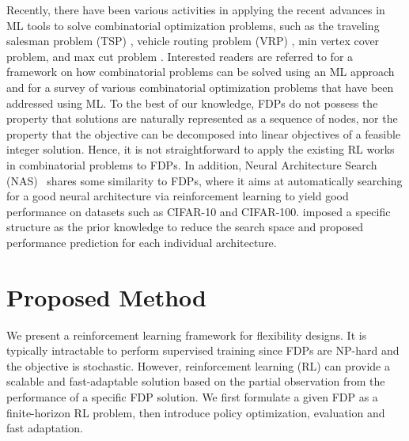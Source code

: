 \documentclass{article} %
\newcommand{\lei}[1]{{\color{red}{\bf\sf [Lei: #1]}}}
\begin{document}
Recently, there have been various activities in applying the recent advances in ML tools to solve combinatorial optimization problems, such as the traveling salesman problem (TSP) \citep{bello2016neural,vinyals2015pointer}, vehicle routing problem (VRP) \citep{kool2018attention, nazari2018reinforcement}, min vertex cover problem, and max cut problem \citep{abe2019solving}. Interested readers are referred to \citet{bengio2018machine} for a framework on how combinatorial problems can be solved using an ML approach and for a survey of various combinatorial optimization problems that have been addressed using ML. To the best of our knowledge, FDPs do not possess the property that solutions are naturally represented as a sequence of nodes, nor the property that the objective can be decomposed into linear objectives of a feasible integer solution. Hence, it is not straightforward to apply the existing RL works in combinatorial problems to FDPs.
In addition, Neural Architecture Search (NAS)~\citep{baker2016designing,zoph2016neural} shares some similarity to FDPs, where it aims at automatically searching for a good neural architecture via reinforcement learning to yield good performance on datasets such as CIFAR-10 and CIFAR-100. \citet{liu2017hierarchical} imposed a specific structure as the prior knowledge to reduce the search space and \citet{baker2017accelerating} proposed performance prediction for each individual architecture. 









\section{Proposed Method}\label{sec:framework}
We present a reinforcement learning framework for flexibility designs. It is typically intractable to perform supervised training since FDPs are NP-hard and the objective is stochastic. However, reinforcement learning (RL) can provide a scalable and fast-adaptable solution based on the partial observation from the performance of a specific FDP solution. We first formulate a given FDP as a finite-horizon RL problem, then introduce policy optimization, evaluation and fast adaptation.
\end{document}

